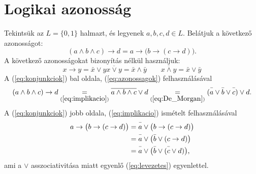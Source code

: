 \documentclass{article}
\begin{document}
\section{Logikai azonosság}
Tekintsük az $L = \{ 0, 1 \}$ halmazt, és legyenek $a, b, c, d \in L$. Belátjuk a következő azonosságot:\\
\begin{equation}\label{eq:konjunkciok}
(a \wedge b \wedge c) \rightarrow d = a \rightarrow \bigl( b \rightarrow (c \rightarrow d) \bigr) \text{.}
\end{equation}
A következő azonosságokat bizonyítás nélkül használjuk:\\
\begin{subequations}\label{eq:azonossagok}
\begin{equation}\label{eq:implikacio}
x \rightarrow y = \bar{x} \vee y
\end{equation}
\begin{equation}\label{eq:De_Morgan}
\overline{x \vee y} = \bar{x} \wedge \bar{y} \qquad \overline{x \wedge y} = \bar{x} \vee \bar{y}
\end{equation}
\end{subequations}
A (\ref{eq:konjunkciok}) bal oldala, (\ref{eq:azonossagok}) felhasználásával
\begin{equation}\label{eq:levezetes}
(a \wedge b \wedge c) \rightarrow d \underset{(\ref{eq:implikacio})}{=} \overline{a \wedge b \wedge c} \vee d \underset{(\ref{eq:De_Morgan})}{=} (\bar{\mathstrut a} \vee \bar{\mathstrut b} \vee \bar{\mathstrut c}) \vee d \text{.}
\end{equation}
A (\ref{eq:konjunkciok}) jobb oldala, (\ref{eq:implikacio}) ismételt felhasználásával
\begin{align}\label{eq:diszjunkciok}
\begin{split}
a \rightarrow \bigl( b \rightarrow (c \rightarrow d) \bigr) &= \bar{\mathstrut a} \vee \bigl( b \rightarrow (c \rightarrow d) \bigr) \\
&= \bar{\mathstrut a} \vee \bigl( \bar{\mathstrut b} \vee (c \rightarrow d) \bigr) \\
&= \bar{\mathstrut a} \vee \bigl( \bar{\mathstrut b} \vee (\bar{\mathstrut c} \vee d) \bigr) \text{,}
\end{split}
\end{align}
ami a $\vee$ asszociativitása miatt egyenlő (\ref{eq:levezetes}) egyenlettel.
\clearpage
\end{document}
